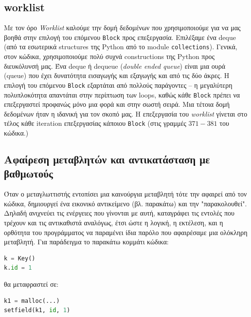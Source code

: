 \subsection{worklist}

Με τον όρο \textit{Worklist} καλούμε την δομή δεδομένων που χρησιμοποιούμε για
να μας βοηθά στην επιλογή του επόμενου \texttt{Block} προς επεξεργασία.
Επιλέξαμε ένα deque\cite{deque} (από τα εσωτερικά structures της Python από το
module \texttt{collections}). Γενικά, στον κώδικα, χρησιμοποιούμε πολύ συχνά
constructions της Python προς διευκόλυνσή μας. Ένα deque ή dequeue
(\textit{double ended queue}) είναι μια ουρά (queue) που έχει δυνατότητα
εισαγωγής και εξαγωγής και από τις δύο άκρες. Η επιλογή του επόμενου
\texttt{Block} εξαρτάται από πολλούς παράγοντες – η μεγαλύτερη πολυπλοκότητα
απαντάται στην περίπτωση των loops, καθώς κάθε \texttt{Block} πρέπει να
επεξεργαστεί προφανώς μόνο μια φορά και στην σωστή σειρά. Μια τέτοια δομή
δεδομένων ήταν η ιδανική για τον σκοπό μας. Η επεξεργασία του \textit{worklist}
γίνεται στο τέλος κάθε iteration επεξεργασίας κάποιου \texttt{Block} (στις
γραμμές $371-381$ του κώδικα.)

\subsection{Αφαίρεση μεταβλητών και αντικατάσταση με βαθμωτούς}

Όταν ο μεταγλωττιστής εντοπίσει μια καινούργια μεταβλητή τότε την αφαιρεί από
τον κώδικα, δημιουργεί ένα εικονικό αντικείμενο (βλ. παρακάτω) και την
"παρακολουθεί". Δηλαδή ανιχνεύει τις ενέργειες που γίνονται με αυτή, καταγράφει
τις εντολές που τρέχουν και τις αντικαθιστά αναλόγως, έτσι ώστε η λογική, η
εκτέλεση, και η ορθότητα του προγράμματος να παραμένει ίδια παρόλο που
αφαιρέσαμε μια ολόκληρη μεταβλητή. Για παράδειγμα το παρακάτω κομμάτι κώδικα:

\begin{lstlisting}[language=Python, deletendkeywords={id}]
k = Key()
k.id = 1
\end{lstlisting}

θα μεταφραστεί σε:

\begin{lstlisting}[language=Python, deletendkeywords={id}, keywords={malloc}]
k1 = malloc(...)
setfield(k1, id, 1)
\end{lstlisting}

